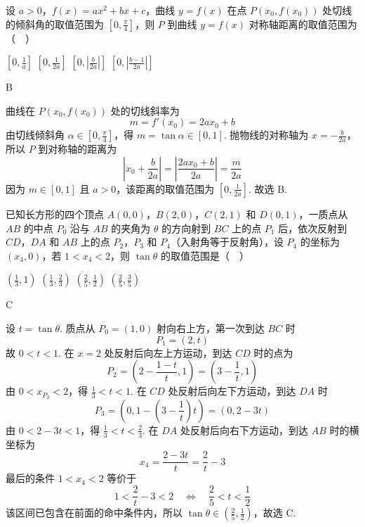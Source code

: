 \begin{problem}
设 \(a > 0\)，\(f(x) = ax^2 + bx + c\)，曲线 \(y = f(x)\) 在点 \(P(x_0, f(x_0))\) 处切线的倾斜角的取值范围为 \(\left[0, \frac{\pi}{4}\right]\)，则 \(P\) 到曲线 \(y = f(x)\) 对称轴距离的取值范围为（\(\quad\)）

\choices
    {\(\left[0, \frac{1}{a}\right]\)}
    {\(\left[0, \frac{1}{2a}\right]\)}
    {\(\left[0, \left|\frac{b}{2a}\right|\right]\)}
    {\(\left[0, \left|\frac{b-1}{2a}\right|\right]\)}
\end{problem}

\begin{answer}
B
\end{answer}

\begin{solution}
曲线在 \(P(x_0,f(x_0))\) 处的切线斜率为
\[
m=f'(x_0)=2ax_0+b
\]
由切线倾斜角 \(\alpha\in\left[0,\frac{\pi}{4}\right]\)，得 \(m=\tan\alpha\in[0,1]\). 抛物线的对称轴为 \(x=-\frac{b}{2a}\)，所以 \(P\) 到对称轴的距离为
\[
\left|x_0+\frac{b}{2a}\right|
=\left|\frac{2ax_0+b}{2a}\right|
=\frac{m}{2a}
\]
因为 \(m\in[0,1]\) 且 \(a>0\)，该距离的取值范围为 \(\left[0,\frac{1}{2a}\right]\). 故选 B.
\end{solution}

\begin{problem}
已知长方形的四个顶点 \(A(0,0)\)，\(B(2,0)\)，\(C(2,1)\) 和 \(D(0,1)\)，一质点从 \(AB\) 的中点 \(P_0\) 沿与 \(AB\) 的夹角为 \(\theta\) 的方向射到 \(BC\) 上的点 \(P_1\) 后，依次反射到 \(CD\)，\(DA\) 和 \(AB\) 上的点 \(P_2\)，\(P_3\) 和 \(P_4\)（入射角等于反射角），设 \(P_4\) 的坐标为 \((x_4,0)\)，若 \(1 < x_4 < 2\)，则 \(\tan \theta\) 的取值范围是（\(\quad\)）

\choices
    {\(\left(\frac{1}{3},1\right)\)}
    {\(\left(\frac{1}{3},\frac{2}{3}\right)\)}
    {\(\left(\frac{2}{5},\frac{1}{2}\right)\)}
    {\(\left(\frac{2}{5},\frac{3}{5}\right)\)}
\end{problem}

\begin{answer}
C
\end{answer}

\begin{solution}
设 \(t=\tan\theta\). 质点从 \(P_0=(1,0)\) 射向右上方，第一次到达 \(BC\) 时
\[
P_1=(2,t)
\]
故 \(0<t<1\). 在 \(x=2\) 处反射后向左上方运动，到达 \(CD\) 时的点为
\[
P_2=\left(2-\frac{1-t}{t},1\right)=\left(3-\frac1t,1\right)
\]
由 \(0<x_{P_2}<2\)，得 \(\frac13<t<1\). 在 \(CD\) 处反射后向左下方运动，到达 \(DA\) 时
\[
P_3=\left(0,1-\left(3-\frac1t\right)t\right)=(0,2-3t)
\]
由 \(0<2-3t<1\)，得 \(\frac13<t<\frac23\). 在 \(DA\) 处反射后向右下方运动，到达 \(AB\) 时的横坐标为
\[
x_4=\frac{2-3t}{t}=\frac2t-3
\]
最后的条件 \(1<x_4<2\) 等价于
\[
1<\frac2t-3<2
\quad\Longleftrightarrow\quad
\frac25<t<\frac12
\]
该区间已包含在前面的命中条件内，所以 \(\tan\theta\in\left(\frac25,\frac12\right)\)，故选 C.
\end{solution}

